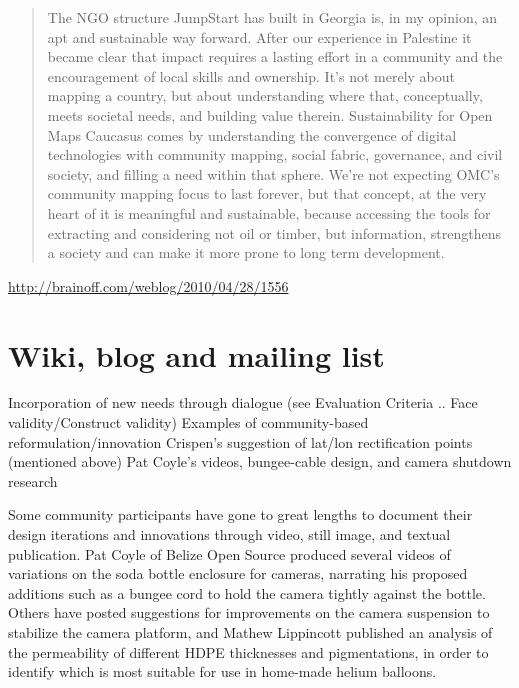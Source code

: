 \documentclass[11pt]{report}
\begin{document}
\begin{quote}The NGO structure JumpStart has built in Georgia is, in my opinion, an apt and sustainable way forward. After our experience in Palestine it became clear that impact requires a lasting effort in a community and the encouragement of local skills and ownership. It’s not merely about mapping a country, but about understanding where that, conceptually, meets societal needs, and building value therein. Sustainability for Open Maps Caucasus comes by understanding the convergence of digital technologies with community mapping, social fabric, governance, and civil society, and filling a need within that sphere. We’re not expecting OMC’s community mapping focus to last forever, but that concept, at the very heart of it is meaningful and sustainable, because accessing the tools for extracting and considering not oil or timber, but information, strengthens a society and can make it more prone to long term development.\end{quote} \url{http://brainoff.com/weblog/2010/04/28/1556}


\section{Wiki, blog and mailing list}
        Incorporation of new needs through dialogue (see Evaluation Criteria .. Face validity/Construct validity)
        Examples of community-based reformulation/innovation
            Crispen's suggestion of lat/lon rectification points (mentioned above)
            Pat Coyle's videos, bungee-cable design, and camera shutdown research

Some community participants have gone to great lengths to document their design iterations and innovations through video, still image, and textual publication. Pat Coyle of Belize Open Source produced several videos of variations on the soda bottle enclosure for cameras, narrating his proposed additions such as a bungee cord to hold the camera tightly against the bottle. Others have posted suggestions for improvements on the camera suspension to stabilize the camera platform, and Mathew Lippincott published an analysis of the permeability of different HDPE thicknesses and pigmentations, in order to identify which is most suitable for use in home-made helium balloons.

\end{document}
